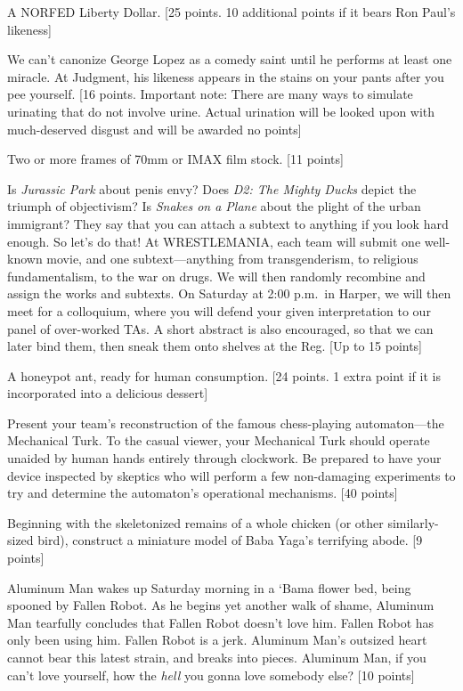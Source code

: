 \documentclass{book}
\begin{document}
\begin{list}{}{}
\item  A NORFED Liberty Dollar.  [25 points. 10 additional points if it bears Ron Paul's likeness]

\item We can't canonize George Lopez as a comedy saint until he performs at least one miracle. At Judgment, his likeness appears in the stains on your pants after you pee yourself. [16 points. Important note: There are many ways to simulate urinating that do not involve urine. Actual urination will be looked upon with much-deserved disgust and will be awarded no points]

\item Two or more frames of 70mm or IMAX film stock. [11 points]

\item Is \emph{Jurassic Park} about penis envy? Does \emph{D2: The Mighty Ducks} depict the triumph of objectivism? Is \emph{Snakes on a Plane} about the plight of the urban immigrant? They say that you can attach a subtext to anything if you look hard enough. So let's do that! At WRESTLEMANIA, each team will submit one well-known movie, and one subtext---anything from transgenderism, to religious fundamentalism, to the war on drugs. We will then randomly recombine and assign the works and subtexts. On Saturday at 2:00 p.m.\ in Harper, we will then meet for a colloquium, where you will defend your given interpretation to our panel of over-worked TAs. A short abstract is also encouraged, so that we can later bind them, then sneak them onto shelves at the Reg. [Up to 15 points]

\item  A honeypot ant, ready for human consumption. [24 points. 1 extra point if it is incorporated into a delicious dessert]

\item Present your team's reconstruction of the famous chess-playing automaton---the Mechanical Turk.  To the casual viewer, your Mechanical Turk should operate unaided by human hands entirely through clockwork.  Be prepared to have your device inspected by skeptics who will perform a few non-damaging experiments to try and determine the automaton's operational mechanisms. [40 points]

\item  Beginning with the skeletonized remains of a whole chicken (or other similarly-sized bird), construct a miniature model of Baba Yaga's terrifying abode. [9 points]

\item Aluminum Man wakes up Saturday morning in a `Bama flower bed, being spooned by Fallen Robot. As he begins yet another walk of shame, Aluminum Man tearfully concludes that Fallen Robot doesn't love him. Fallen Robot has only been using him. Fallen Robot is a jerk. Aluminum Man's outsized heart cannot bear this latest strain, and breaks into pieces. Aluminum Man, if you can't love yourself, how the \emph{hell} you gonna love somebody else?  [10 points]


\end{list}
\end{document}
